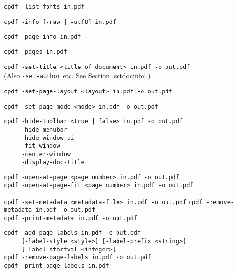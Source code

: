 \documentclass{book}
\begin{document}
  \begin{framed}
    \small\noindent\verb!cpdf -list-fonts in.pdf!

    \vspace{1.5mm}
    \small\noindent\verb!cpdf -info [-raw | -utf8] in.pdf!

    \vspace{1.5mm}
    \small\noindent\verb!cpdf -page-info in.pdf!

    \vspace{1.5mm}
    \small\noindent\verb!cpdf -pages in.pdf!

    \vspace{1.5mm}
    \small\noindent\verb!cpdf -set-title <title of document> in.pdf -o out.pdf!\\
    (Also \texttt{-set-author} etc. See Section \ref{setdocinfo}.)

    \vspace{1.5mm}
    \small\noindent\verb!cpdf -set-page-layout <layout> in.pdf -o out.pdf!

    \vspace{1.5mm}
    \small\noindent\verb!cpdf -set-page-mode <mode> in.pdf -o out.pdf!

    \vspace{1.5mm} 
    \small\noindent\verb!cpdf -hide-toolbar <true | false> in.pdf -o out.pdf!\\
    \noindent\verb!     -hide-menubar!\\
    \noindent\verb!     -hide-window-ui!\\
    \noindent\verb!     -fit-window!\\
    \noindent\verb!     -center-window!\\
    \noindent\verb!     -display-doc-title!
    
    \vspace{1.5mm}
    \small\noindent\verb!cpdf -open-at-page <page number> in.pdf -o out.pdf!\\
    \noindent\verb!cpdf -open-at-page-fit <page number> in.pdf -o out.pdf!

    \vspace{1.5mm}
    \small\noindent\verb!cpdf -set-metadata <metadata-file> in.pdf -o out.pdf!
    \small\noindent\verb!cpdf -remove-metadata in.pdf -o out.pdf!\\
    \small\noindent\verb!cpdf -print-metadata in.pdf -o out.pdf!
    
    \vspace{1.5mm}
    \small\noindent\verb!cpdf -add-page-labels in.pdf -o out.pdf!\\
    \noindent\verb!     [-label-style <style>] [-label-prefix <string>]!\\
    \noindent\verb!     [-label-startval <integer>]!\\
    
    \vspace{1.5mm}
    \small\noindent\verb!cpdf -remove-page-labels in.pdf -o out.pdf!\\
    \small\noindent\verb!cpdf -print-page-labels in.pdf!
  \end{framed}
\end{document}
